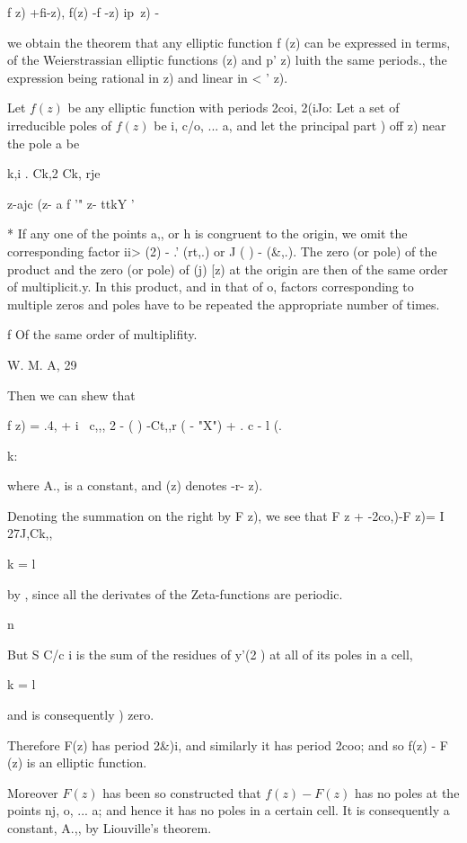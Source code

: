 {f z) +fi-z), f(z) -f -z) ip\ z) -\

we obtain the theorem that any elliptic function f (z) can be
expressed in terms, of the Weierstrassian elliptic functions (z) and
p' z) luith the same periods., the expression being rational in z) and
linear in < ' z).


Let $f(z)$ be any elliptic function with periods 2coi, 2(iJo: Let a set
of irreducible poles of $f(z)$ be i, c/o, ... a, and let the principal
part ) off z) near the pole a be

 k,i . Ck,2 Ck, rje

z-ajc (z- a f '" z- ttkY '

* If any one of the points a,, or h is congruent to the origin, we
omit the corresponding factor ii> (2) - .' (rt,.) or J ( ) - (\&,.).
The zero (or pole) of the product and the zero (or pole) of (j) [z) at
the origin are then of the same order of multiplicit.y. In this
product, and in that of o, factors corresponding to multiple
zeros and poles have to be repeated the appropriate number of times.

f Of the same order of multiplifity.

W. M. A, 29

%
%

Then we can shew that

f z) = .4, + i \ c,,, 2 - ( ) -Ct,,r ( - "X") + . c - l (.

k:

where A., is a constant, and (z) denotes -r- z).

Denoting the summation on the right by F z), we see that F z +
-2co,)-F z)= I 27J,Ck,,

k = l

by , since all the derivates of the Zeta-functions are
periodic.

n

But S C/c i is the sum of the residues of y'(2 ) at all of its poles
in a cell,

k = l

and is consequently ) zero.

Therefore F(z) has period 2\&)i, and similarly it has period 2coo; and
so f(z) - F (z) is an elliptic function.

Moreover $F(z)$ has been so constructed that $f(z) - F(z)$ has no poles at
the points nj, o, ... a; and hence it has no poles in a certain cell.
It is consequently a constant, A.,, by Liouville's theorem.

}
